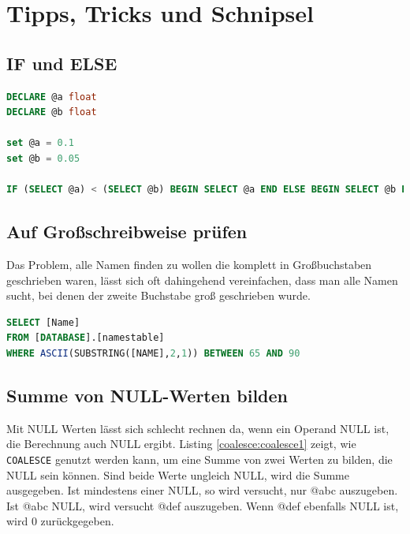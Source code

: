 \documentclass[12pt,ngerman,a4paper,index=totoc,twoside]{scrartcl}
\newcommand{\sql}[1]{\texttt{#1}}
\newcommand{\lwidth}{0.75}
\begin{document}
\section{Tipps, Tricks und Schnipsel}

\subsection{IF und ELSE}


\begin{center}
\begin{minipage}{\lwidth\textwidth}
\begin{lstlisting}[language={SQL},caption={Kleines \sql{IF-ELSE} Beispiel},label={tricks:if1}]
DECLARE @a float
DECLARE @b float

set @a = 0.1
set @b = 0.05

IF (SELECT @a) < (SELECT @b) BEGIN SELECT @a END ELSE BEGIN SELECT @b END
\end{lstlisting}
\end{minipage}
\end{center} 


\subsection{Auf Großschreibweise prüfen}

Das Problem, alle Namen finden zu wollen die komplett in Großbuchstaben geschrieben waren, lässt sich oft dahingehend vereinfachen, dass man alle Namen sucht, bei denen der zweite Buchstabe groß geschrieben wurde.

\begin{center}
\begin{minipage}{\lwidth\textwidth}
\begin{lstlisting}[language={SQL},caption={Nach Großbuchstaben suchen},label={tricks:ascii1}]
SELECT [Name]
FROM [DATABASE].[namestable]
WHERE ASCII(SUBSTRING([NAME],2,1)) BETWEEN 65 AND 90
\end{lstlisting}
\end{minipage}
\end{center}


\subsection{Summe von NULL-Werten bilden}

Mit NULL Werten lässt sich schlecht rechnen da, wenn ein Operand NULL ist, die Berechnung auch NULL ergibt. Listing \ref{coalesce:coalesce1} zeigt, wie \sql{COALESCE} genutzt werden kann, um eine Summe von zwei Werten zu bilden, die NULL sein können. Sind beide Werte ungleich NULL, wird die Summe ausgegeben. Ist mindestens einer NULL, so wird versucht, nur @abc auszugeben. Ist @abc NULL, wird versucht @def auszugeben. Wenn @def ebenfalls NULL ist, wird 0 zurückgegeben.
\end{document}
